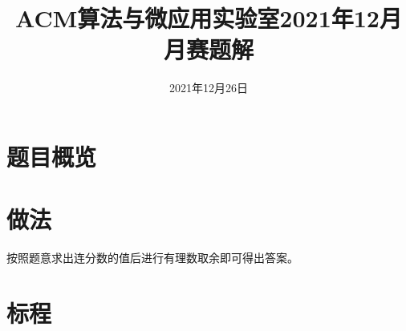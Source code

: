 \documentclass{ctsol}
\title{ACM算法与微应用实验室2021年12月月赛题解}
\date{2021年12月26日}
\begin{document}
\maketitle
{}

\section*{题目概览}
\solutiontab

\makesolution
\section*{做法}
按照题意求出连分数的值后进行有理数取余即可得出答案。

\section*{标程}
\end{document}
